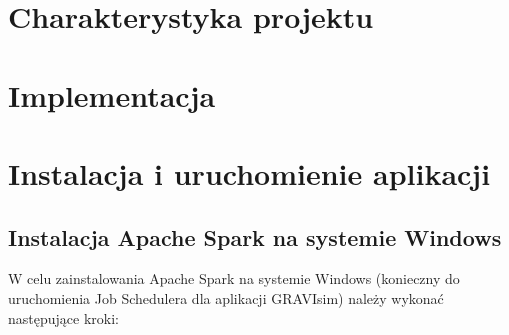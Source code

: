 \documentclass[a4paper,onecolumn,oneside,12pt]{memoir}
\begin{document}
{\chapter{Charakterystyka projektu}

\chapter{Implementacja}



\chapter{Instalacja i uruchomienie aplikacji}

\section{Instalacja Apache Spark na systemie Windows}
W celu zainstalowania Apache Spark na systemie Windows (konieczny do uruchomienia Job Schedulera dla aplikacji GRAVIsim) należy wykonać następujące kroki:

}
\end{document}
